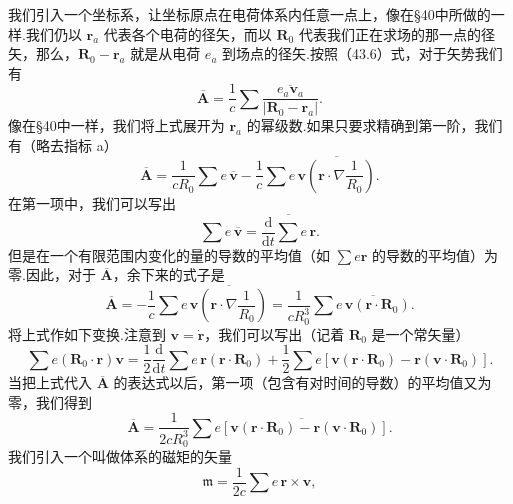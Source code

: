 我们引入一个坐标系，让坐标原点在电荷体系内任意一点上，像在§40中所做的一样.我们仍以 $\boldsymbol{r}_a$ 代表各个电荷的径矢，而以 $\boldsymbol{R}_0$ 代表我们正在求场的那一点的径矢，那么，$\boldsymbol{R}_0-\boldsymbol{r}_a$ 就是从电荷 $e_a$ 到场点的径矢.按照（43.6）式，对于矢势我们有
\begin{equation}
  \overline{\boldsymbol{A}}
  =\frac{1}{c}\sum\overline{\frac{e_a\boldsymbol{v}_a}{|\boldsymbol{R}_0-\boldsymbol{r}_a|}}.
\end{equation}
像在§40中一样，我们将上式展开为 $\boldsymbol{r}_a$ 的幂级数.如果只要求精确到第一阶，我们有（略去指标 a）
\begin{equation*}
  \overline{\boldsymbol{A}}
  =\frac{1}{cR_0}\sum e\,\overline{\boldsymbol{v}}
  -\frac{1}{c}\sum e\,\overline{\boldsymbol{v}\left(\boldsymbol{r}\cdot\nabla\frac{1}{R_0}\right)}.
\end{equation*}
在第一项中，我们可以写出
\begin{equation*}
  \sum e\,\overline{\boldsymbol{v}}
  =\overline{\frac{\mathrm{d}}{\mathrm{d}t}\sum e\,\boldsymbol{r}}.
\end{equation*}
但是在一个有限范围内变化的量的导数的平均值（如 $\sum e\boldsymbol{r}$ 的导数的平均值）为零.因此，对于 $\overline{\boldsymbol{A}}$，余下来的式子是
\begin{equation*}
  \overline{\boldsymbol{A}}
  =-\frac{1}{c}\sum e\,\overline{\boldsymbol{v}\left(\boldsymbol{r}\cdot\nabla\frac{1}{R_0}\right)}
  =\frac{1}{cR_0^3}\sum\overline{e\,\boldsymbol{v}(\boldsymbol{r}\cdot\boldsymbol{R}_0)}.
\end{equation*}
将上式作如下变换.注意到 $\boldsymbol{v}=\dot{\boldsymbol{r}}$，我们可以写出（记着 $\boldsymbol{R}_0$ 是一个常矢量）
\begin{equation*}
  \sum e(\boldsymbol{R}_0\cdot\boldsymbol{r})\boldsymbol{v}
  =\frac{1}{2}\frac{\mathrm{d}}{\mathrm{d}t}\sum e\,\boldsymbol{r}(\boldsymbol{r}\cdot\boldsymbol{R}_0)
  +\frac{1}{2}\sum e[\boldsymbol{v}(\boldsymbol{r}\cdot\boldsymbol{R}_0)
  -\boldsymbol{r}(\boldsymbol{v}\cdot\boldsymbol{R}_0)].
\end{equation*}
当把上式代入 $\overline{\boldsymbol{A}}$ 的表达式以后，第一项（包含有对时间的导数）的平均值又为零，我们得到
\begin{equation*}
  \overline{\boldsymbol{A}}
  =\frac{1}{2cR_0^3}\sum\overline{
  e[\boldsymbol{v}(\boldsymbol{r}\cdot\boldsymbol{R}_0)
  -\boldsymbol{r}(\boldsymbol{v}\cdot\boldsymbol{R}_0)]}.
\end{equation*}
我们引入一个叫做体系的磁矩的矢量
\begin{equation}
  \mathfrak{m}=\frac{1}{2c}\sum e\,\boldsymbol{r}\times\boldsymbol{v},
\end{equation}
